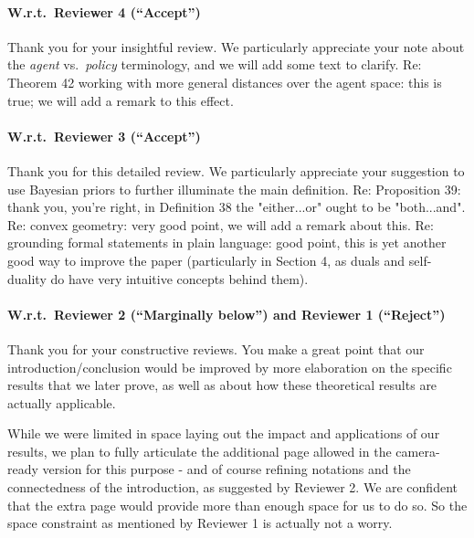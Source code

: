 \documentclass{article}
\begin{document}

\paragraph{W.r.t.\ Reviewer 4 (``Accept'')}

Thank you for your insightful review. We particularly appreciate your note about the \emph{agent} vs.\ \emph{policy} terminology, and we will add some text to clarify. Re: Theorem 42 working with more general distances over the agent space: this is true; we will add a remark to this effect.

\paragraph{W.r.t.\ Reviewer 3 (``Accept'')}

Thank you for this detailed review. We particularly appreciate your suggestion to use Bayesian priors to further illuminate the main definition. Re: Proposition 39: thank you, you're right, in Definition 38 the "either...or" ought to be "both...and". Re: convex geometry: very good point, we will add a remark about this. Re: grounding formal statements in plain language: good point, this is yet another good way to improve the paper (particularly in Section 4, as duals and self-duality do have very intuitive concepts behind them).

\paragraph{W.r.t.\ Reviewer 2 (``Marginally below'') and Reviewer 1 (``Reject'')}

Thank you for your constructive reviews. You make a great point that our introduction/conclusion would
be improved by more elaboration on the specific results that we later prove, as well as
about how these theoretical results are actually applicable.

While we were limited in space laying out the impact and
applications
of our results, we plan to fully articulate the additional page
allowed in the camera-ready version for this purpose - and of course refining notations and the connectedness of the introduction, as suggested by Reviewer 2.
We are confident that the extra page would provide more than enough space for us to do so. So the space constraint as mentioned by Reviewer 1 is actually not a worry.
\end{document}
